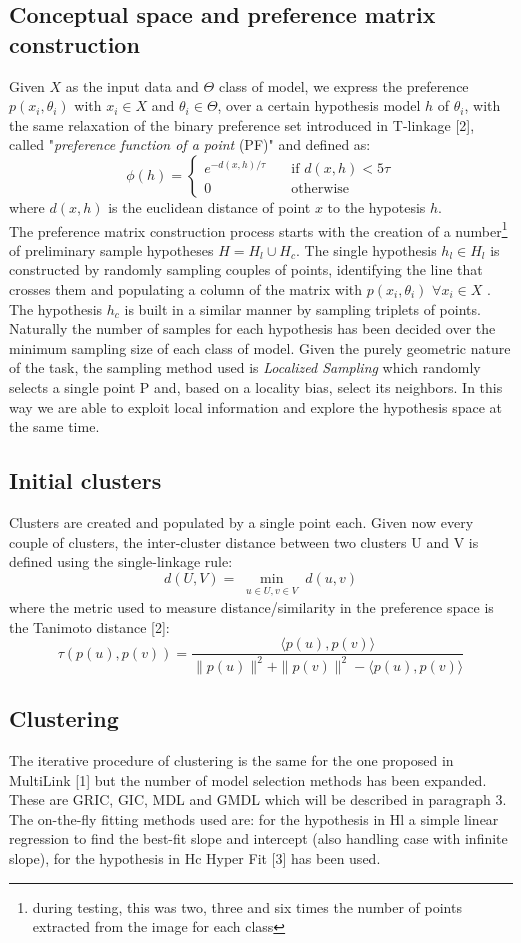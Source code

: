 \documentclass[12pt]{article}
\begin{document}
\subsection{ Conceptual space and preference matrix construction}
Given $X$ as the input data and $\Theta$ class of model, we express the preference $p(x_i,\theta_i)$  with $x_i \in X$ and $\theta_i \in \Theta$, over a certain hypothesis model $h$ of $\theta_i$, with the same relaxation of the binary preference set introduced in T-linkage [2], called "\textit{preference function of a point} (PF)" and defined as:
\[ \phi(h) =
  \begin{cases}
    e^{-d(x,h)/\tau}       & \quad \text{if } d(x,h)<5\tau \text{}\\
    0  & \quad \text{otherwise}
  \end{cases}
\]
where $d(x,h)$ is the euclidean distance of point $x$ to the hypotesis $h$.
\\The preference matrix construction process starts with the creation of a number\footnote{during testing, this was  two, three and six times the number of points extracted from the image for each class} of preliminary sample hypotheses $H = H_l \cup H_c$. The single hypothesis $h_l \in H_l$ is constructed by randomly sampling couples of points,  identifying the line that crosses them and populating a column of the matrix with $p(x_i,\theta_i)$  $\forall x_i \in X$ . The hypothesis $h_c$ is built in a similar manner by sampling triplets of points. Naturally the number of samples for each hypothesis has been decided over the minimum sampling size of each class of model. Given the purely geometric nature of the task, the sampling method used is \textit{Localized Sampling} which randomly selects a single point P and, based on a locality bias, select its neighbors. In this way we are able to exploit local information and explore the hypothesis space at the same time.
\subsection{Initial clusters}
Clusters are created and populated by a single point each.  Given now every couple of clusters, the inter-cluster distance between two clusters U and V is defined using the single-linkage rule:
\[ d(U,V) = \min_{\substack{u \in U, v \in V}}d(u,v)\]
where the metric used to measure distance/similarity in the preference space is the Tanimoto distance [2]:
\[\tau(p(u),p(v)) = \frac{\langle p(u),p(v)\rangle}{\|p(u)\|^2+\|p(v)\|^2-\langle p(u),p(v)\rangle}  
\]
\subsection{Clustering}
The iterative procedure of clustering is the same for the one proposed in MultiLink [1] but the number of model selection methods has been expanded. These are GRIC, GIC, MDL and GMDL which will be described in paragraph 3. The on-the-fly fitting methods used are: for the hypothesis in Hl a simple linear regression to find the best-fit slope and intercept (also handling case with infinite slope), for the hypothesis in Hc Hyper Fit [3] has been used.
\end{document}

